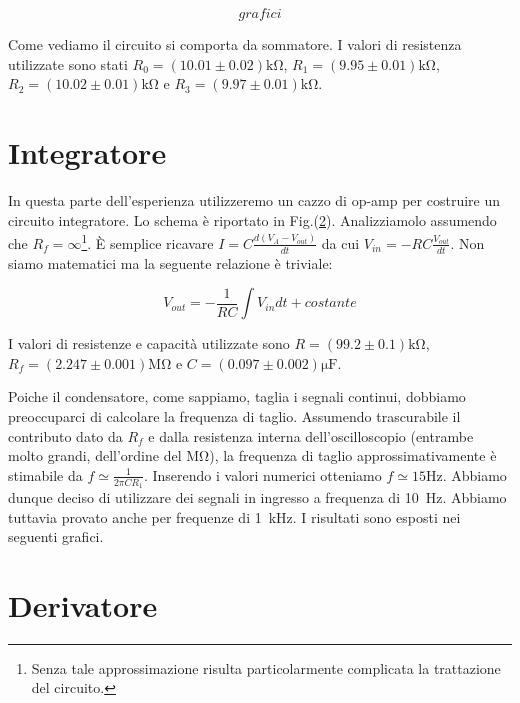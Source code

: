 $$grafici$$

Come vediamo il circuito si comporta da sommatore. I valori di resistenza utilizzate sono stati $R_0=(10.01\pm0.02)\si{\kilo\ohm}$, $R_1=(9.95\pm0.01)\si{\kilo\ohm}$, $R_2=(10.02\pm 0.01)\si{\kilo\ohm}$ e $R_3=(9.97\pm0.01)\si{\kilo\ohm}$.


\section{Integratore}

In questa parte dell'esperienza utilizzeremo un cazzo di op-amp per costruire un circuito integratore. Lo schema è riportato in Fig.(\ref{}). Analizziamolo assumendo che $R_f=\infty$\footnote{Senza tale approssimazione risulta particolarmente complicata la trattazione del circuito.}. È semplice ricavare $I=C\frac{d(V_A-V_{out})}{dt}$ da cui $V_{in}=-RC\frac{V_{out}}{dt}$. Non siamo matematici ma la seguente relazione è triviale:

$$V_{out}=-\frac{1}{RC} \int V_{in}dt +costante$$

I valori di resistenze e capacità utilizzate sono $R=(99.2 \pm 0.1)\si{\kilo\ohm}$, $R_f=(2.247 \pm 0.001)\si{\mega\ohm}$ e $C=(0.097 \pm 0.002) \si{\micro\farad}$. 

Poiche il condensatore, come sappiamo, taglia i segnali continui, dobbiamo preoccuparci di calcolare la frequenza di taglio. Assumendo trascurabile il contributo dato da $R_f$ e dalla resistenza interna dell'oscilloscopio (entrambe molto grandi, dell'ordine del $\si{\mega\ohm}$), la frequenza di taglio approssimativamente è stimabile da $f\simeq \frac{1}{2\pi C R_1}$. Inserendo i valori numerici otteniamo $f \simeq 15 \si{\hertz}$. Abbiamo dunque deciso di utilizzare dei segnali in ingresso a frequenza di \SI{10}{\hertz}. Abbiamo tuttavia provato anche per frequenze di \SI{1}{\kilo\hertz}. I risultati sono esposti nei seguenti grafici.

\section{Derivatore}